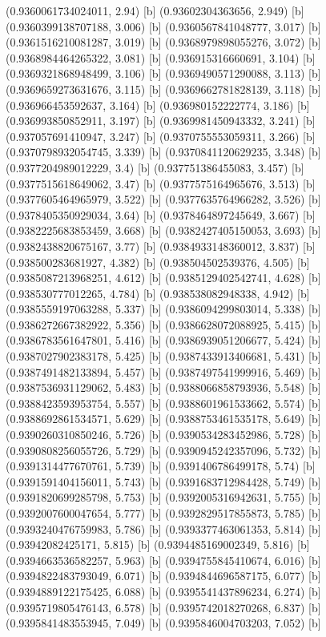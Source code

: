 {{{(0.9360061734024011, 2.94) [b] 
(0.93602304363656, 2.949) [b] 
(0.9360399138707188, 3.006) [b] 
(0.9360567841048777, 3.017) [b] 
(0.9361516210081287, 3.019) [b] 
(0.9368979898055276, 3.072) [b] 
(0.9368984464265322, 3.081) [b] 
(0.936915316660691, 3.104) [b] 
(0.9369321868948499, 3.106) [b] 
(0.9369490571290088, 3.113) [b] 
(0.9369659273631676, 3.115) [b] 
(0.9369662781828139, 3.118) [b] 
(0.936966453592637, 3.164) [b] 
(0.936980152222774, 3.186) [b] 
(0.936993850852911, 3.197) [b] 
(0.9369981450943332, 3.241) [b] 
(0.937057691410947, 3.247) [b] 
(0.9370755553059311, 3.266) [b] 
(0.9370798932054745, 3.339) [b] 
(0.9370841120629235, 3.348) [b] 
(0.9377204989012229, 3.4) [b] 
(0.937751386455083, 3.457) [b] 
(0.9377515618649062, 3.47) [b] 
(0.9377575164965676, 3.513) [b] 
(0.9377605464965979, 3.522) [b] 
(0.9377635764966282, 3.526) [b] 
(0.9378405350929034, 3.64) [b] 
(0.9378464897245649, 3.667) [b] 
(0.9382225683853459, 3.668) [b] 
(0.9382427405150053, 3.693) [b] 
(0.9382438820675167, 3.77) [b] 
(0.9384933148360012, 3.837) [b] 
(0.938500283681927, 4.382) [b] 
(0.938504502539376, 4.505) [b] 
(0.9385087213968251, 4.612) [b] 
(0.9385129402542741, 4.628) [b] 
(0.938530777012265, 4.784) [b] 
(0.938538082948338, 4.942) [b] 
(0.9385559197063288, 5.337) [b] 
(0.9386094299803014, 5.338) [b] 
(0.9386272667382922, 5.356) [b] 
(0.9386628072088925, 5.415) [b] 
(0.9386783561647801, 5.416) [b] 
(0.9386939051206677, 5.424) [b] 
(0.9387027902383178, 5.425) [b] 
(0.9387433913406681, 5.431) [b] 
(0.9387491482133894, 5.457) [b] 
(0.9387497541999916, 5.469) [b] 
(0.9387536931129062, 5.483) [b] 
(0.9388066858793936, 5.548) [b] 
(0.9388423593953754, 5.557) [b] 
(0.9388601961533662, 5.574) [b] 
(0.9388692861534571, 5.629) [b] 
(0.9388753461535178, 5.649) [b] 
(0.9390260310850246, 5.726) [b] 
(0.9390534283452986, 5.728) [b] 
(0.9390808256055726, 5.729) [b] 
(0.9390945242357096, 5.732) [b] 
(0.9391314477670761, 5.739) [b] 
(0.9391406786499178, 5.74) [b] 
(0.9391591404156011, 5.743) [b] 
(0.9391683712984428, 5.749) [b] 
(0.9391820699285798, 5.753) [b] 
(0.9392005316942631, 5.755) [b] 
(0.9392007600047654, 5.777) [b] 
(0.9392829517855873, 5.785) [b] 
(0.9393240476759983, 5.786) [b] 
(0.9393377463061353, 5.814) [b] 
(0.93942082425171, 5.815) [b] 
(0.9394485169002349, 5.816) [b] 
(0.9394663536582257, 5.963) [b] 
(0.9394755845410674, 6.016) [b] 
(0.9394822483793049, 6.071) [b] 
(0.9394844696587175, 6.077) [b] 
(0.9394889122175425, 6.088) [b] 
(0.9395541437896234, 6.274) [b] 
(0.9395719805476143, 6.578) [b] 
(0.9395742018270268, 6.837) [b] 
(0.9395841483553945, 7.049) [b] 
(0.9395846004703203, 7.052) [b] 
}}}

